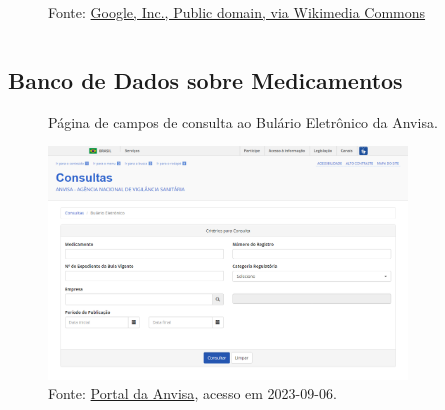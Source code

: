 \begin{frame}
\begin{columns}
\begin{column}{0.5\textwidth}
\begin{figure}
                \caption*{Fonte: \href{https://commons.wikimedia.org/wiki/File:Tesseract_OCR_logo_(Google).png}{Google, Inc., Public domain, via Wikimedia Commons}}
            \end{figure}
        \end{column}
    \end{columns}
\end{frame}

\subsection{Banco de Dados sobre Medicamentos}
\begin{frame}
    \begin{figure}
        \centering
        \caption*{Página de campos de consulta ao Bulário Eletrônico da Anvisa.}
        \label{fig:bulario_pagina}
        \includegraphics[width=0.85\textwidth]{../pictures/bulario_pagina.png}
        \caption*{Fonte: \href{https://consultas.Anvisa.gov.br/\#/bulario/}{Portal da Anvisa}, acesso em 2023-09-06.}
    \end{figure}
\end{frame}
